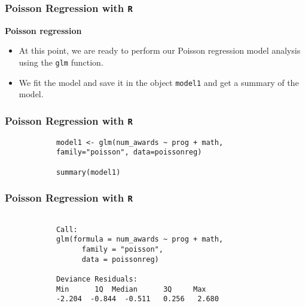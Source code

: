\documentclass[MASTER.tex]{subfiles}
\begin{document}
	
	\begin{frame}[fragile]
		
		\frametitle{Poisson Regression with \texttt{R}}
		\Large
		
		\textbf{Poisson regression}
		\begin{itemize}
			\item At this point, we are ready to perform our Poisson regression model analysis using the \texttt{glm} function. 
			\item We fit the model and save it in the object \texttt{model1} and get a summary of the model.
		\end{itemize}
	\end{frame}
	
	\begin{frame}[fragile]
		
		\frametitle{Poisson Regression with \texttt{R}}
		\large
		\begin{framed}
			\begin{verbatim}
			model1 <- glm(num_awards ~ prog + math, 
			family="poisson", data=poissonreg)
			
			summary(model1)
			\end{verbatim}
		\end{framed}
	\end{frame}
	\begin{frame}[fragile]
		\frametitle{Poisson Regression with \texttt{R}}
	
		\begin{framed}
			\begin{verbatim}
			
			Call:
			glm(formula = num_awards ~ prog + math, 
			      family = "poisson", 
			      data = poissonreg)
			               
			Deviance Residuals: 
			Min      1Q  Median      3Q     Max  
			-2.204  -0.844  -0.511   0.256   2.680  
			\end{verbatim}
		\end{framed}
	\end{frame}
	
\end{document}
